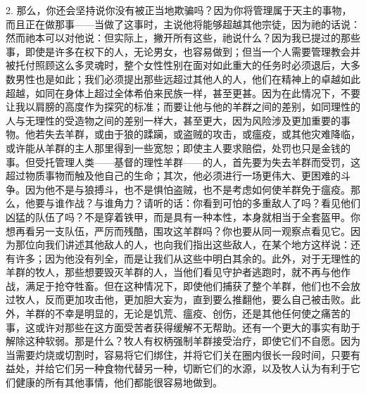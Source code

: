 2. 那么，你还会坚持说你没有被正当地欺骗吗？因为你将管理属于天主的事物，而且正在做那事——当做了这事时，主说他将能够超越其他宗徒，因为祂的话说：然而祂本可以对他说：但实际上，撇开所有这些，祂说什么？因为我已提过的那些事，即使是许多在权下的人，无论男女，也容易做到；但当一个人需要管理教会并被托付照顾这么多灵魂时，整个女性性别在面对如此重大的任务时必须退后，大多数男性也是如此；我们必须提出那些远超过其他人的人，他们在精神上的卓越如此超越，如同在身体上超过全体希伯来民族一样，甚至更甚。因为在此情况下，不要让我以肩膀的高度作为探究的标准；而要让他与他的羊群之间的差别，如同理性的人与无理性的受造物之间的差别一样大，甚至更大，因为风险涉及更加重要的事物。他若失去羊群，或由于狼的蹂躏，或盗贼的攻击，或瘟疫，或其他灾难降临，或许能从羊群的主人那里得到一些宽恕；即使主人要求赔偿，处罚也只是金钱的事。但受托管理人类——基督的理性羊群——的人，首先要为失去羊群而受罚，这超过物质事物而触及他自己的生命；其次，他必须进行一场更伟大、更困难的斗争。因为他不是与狼搏斗，也不是惧怕盗贼，也不是考虑如何使羊群免于瘟疫。那么，他要与谁作战？与谁角力？请听的话：你看到可怕的多重敌人了吗？看见他们凶猛的队伍了吗？不是穿着铁甲，而是具有一种本性，本身就相当于全套盔甲。你想再看另一支队伍，严厉而残酷，围攻这羊群吗？你也要从同一观察点看见它。因为那位向我们讲述其他敌人的人，也向我们指出这些敌人，在某个地方这样说：还有许多；因为他没有列全，而是让我们从这些中明白其余的。此外，对于无理性的羊群的牧人，那些想要毁灭羊群的人，当他们看见守护者逃跑时，就不再与他作战，满足于抢夺牲畜。但在这种情况下，即使他们捕获了整个羊群，他们也不会放过牧人，反而更加攻击他，更加胆大妄为，直到要么推翻他，要么自己被击败。此外，羊群的不幸是明显的，无论是饥荒、瘟疫、创伤，还是其他任何使之痛苦的事，这或许对那些在这方面受苦者获得缓解不无帮助。还有一个更大的事实有助于解除这种软弱。那是什么？牧人有权柄强制羊群接受治疗，即使它们不自愿。因为当需要灼烧或切割时，容易将它们绑住，并将它们关在圈内很长一段时间，只要有益处，并给它们另一种食物代替另一种，切断它们的水源，以及牧人认为有利于它们健康的所有其他事情，他们都能很容易地做到。\par

